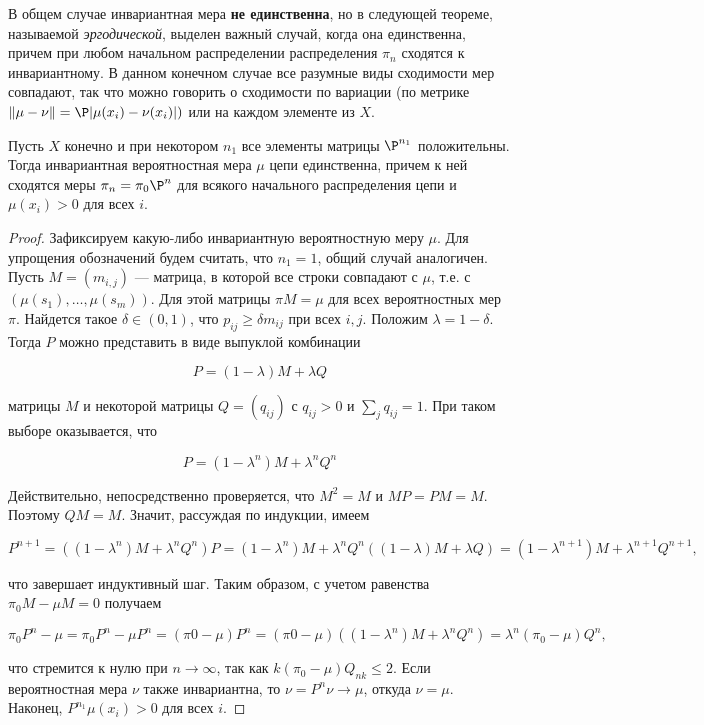 В общем случае инвариантная мера \textbf{не единственна}, но в следующей теореме, называемой \textit{эргодической}, выделен важный случай, когда она единственна, причем при любом начальном распределении распределения $\pi_n$ сходятся к инвариантному. В данном конечном случае все разумные виды сходимости
мер совпадают, так что можно говорить о сходимости по вариации (по
метрике $\|\mu - \nu\| =
\P|\mu(x_i) - \nu(x_i)|)$ или на каждом элементе из $X$.

\begin{theorem}
    Пусть $X$ конечно и при некотором $n_1$ все элементы матрицы $\P^{n_1}$ положительны. Тогда инвариантная вероятностная мера $\mu$ цепи единственна, причем к ней сходятся меры $\pi_n = \pi_0\P^n$ для всякого начального распределения цепи и $\mu(x_i) > 0$ для всех $i$.
\end{theorem}

\begin{proof}
    Зафиксируем какую-либо инвариантную вероятностную меру $\mu$. Для упрощения обозначений будем считать, что $n_1 = 1$, общий случай аналогичен. Пусть $M = (m_{i,j})$ — матрица, в которой все строки совпадают с $\mu$, т.е. с $(\mu(s_1), \ldots, \mu(s_m))$. Для этой матрицы $\pi M = \mu$ для всех вероятностных мер $\pi$. Найдется такое $\delta \in (0, 1)$, что $p_{ij} \geq \delta m_{ij}$ при всех $i, j$. Положим $\lambda = 1 - \delta$. Тогда $P$ можно представить в виде выпуклой комбинации
    
    \[ P = (1 - \lambda)M + \lambda Q \]
    
    матрицы $M$ и некоторой матрицы $Q = (q_{ij} )$ с $q_{ij} > 0$ и $\sum_j q_{ij} = 1$.
    При таком выборе оказывается, что
    
    \[ P = (1 - \lambda^n)M + \lambda^n Q^n \]
    
    Действительно, непосредственно проверяется, что $M^2 = M$ и $MP = PM = M$.
    Поэтому $QM = M$. Значит, рассуждая по индукции, имеем
    
    \[ P^{n+1} = ((1- \lambda^n) M + \lambda^n Q^n)P=(1-\lambda^n)M+\lambda^n Q^n ((1 - \lambda)M + \lambda Q)=(1-\lambda^{n+1})M+\lambda^{n+1}Q^{n+1}, \]
    
    что завершает индуктивный шаг. Таким образом, с учетом равенства $\pi_0 M - \mu M = 0$ получаем
    
    \[ \pi_0 P^n-\mu = \pi_0 P^n-\mu P^n = (\pi0-\mu)P^n = (\pi0-\mu)((1-\lambda^n)M +\lambda^n Q^n) = \lambda^n (\pi_0 - \mu)Q^n, \]
    
    что стремится к нулю при $n \to \infty$, так как $k(\pi_0 - \mu)Q_{nk} \leq 2$. Если вероятностная мера $\nu$ также инвариантна, то $\nu = P^n \nu \to \mu$, откуда $\nu = \mu$. Наконец, $P^{n_1} \mu(x_i) > 0$ для всех $i$.
\end{proof}


